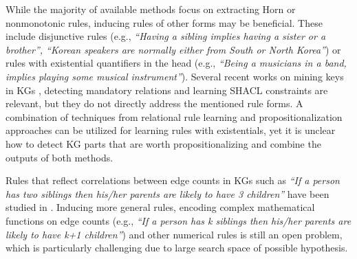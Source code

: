 While the majority of available methods focus on extracting Horn or nonmonotonic rules, inducing rules of other forms may be beneficial. These include %
disjunctive rules
(e.g., \emph{``Having a sibling implies having a sister or a brother'', ``Korean speakers are normally either from South or North Korea''})
 or rules with existential quantifiers in the head (e.g., \emph{``Being a musicians in a band, implies  playing some musical instrument''}).
Several recent works on mining keys in KGs \cite{vickey,DBLP:conf/www/LajusS18}, detecting mandatory relations \cite{DBLP:conf/www/LajusS18} and learning SHACL constraints \cite{shacl} are relevant, but they do not directly address the mentioned rule forms. A combination of techniques from relational rule learning \cite{DBLP:books/daglib/0021868} and propositionalization approaches \cite{propos} can be utilized for learning rules with existentials, yet it is unclear how to detect KG parts that are worth propositionalizing and combine the outputs of both methods.  %

Rules that reflect correlations between edge counts in KGs such as \emph{``If a person has two siblings then his/her parents are likely to have 3 children''} have been studied in \cite{carl}. Inducing more general rules, encoding complex mathematical functions on edge counts (e.g.,  \emph{``If a person has k siblings then his/her parents are likely to have k+1 children''}) and other numerical rules is still an open problem, which is particularly challenging due to large search space of possible hypothesis.

